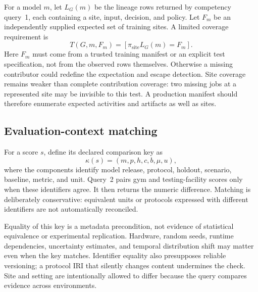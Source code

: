 \documentclass[conference]{IEEEtran}
\begin{document}
For a model $m$, let $L_G(m)$ be the lineage rows returned by competency query~1, each containing a site, input, decision, and policy. Let $F_m$ be an independently supplied expected set of training sites. A limited coverage requirement is
\begin{equation}
 T(G,m,F_m) = [\pi_{\mathrm{site}}L_G(m)=F_m].
\label{eq:trace}
\end{equation}
Here $F_m$ must come from a trusted training manifest or an explicit test specification, not from the observed rows themselves. Otherwise a missing contributor could redefine the expectation and escape detection. Site coverage remains weaker than complete contribution coverage: two missing jobs at a represented site may be invisible to this test. A production manifest should therefore enumerate expected activities and artifacts as well as sites.

\subsection{Evaluation-context matching}
For a score $s$, define its declared comparison key as
\begin{equation}
 \kappa(s)=(m,p,h,c,b,\mu,u),
\label{eq:key}
\end{equation}
where the components identify model release, protocol, holdout, scenario, baseline, metric, and unit. Query~2 pairs gym and testing-facility scores only when these identifiers agree. It then returns the numeric difference. Matching is deliberately conservative: equivalent units or protocols expressed with different identifiers are not automatically reconciled.

Equality of this key is a metadata precondition, not evidence of statistical equivalence or experimental replication. Hardware, random seeds, runtime dependencies, uncertainty estimates, and temporal distribution shift may matter even when the key matches. Identifier equality also presupposes reliable versioning; a protocol IRI that silently changes content undermines the check. Site and setting are intentionally allowed to differ because the query compares evidence across environments.
\end{document}
